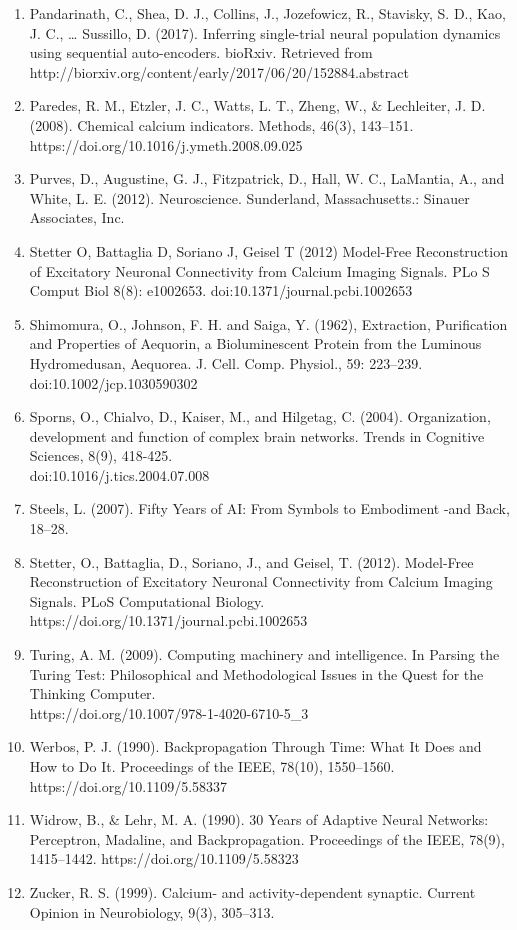 \documentclass{article}
\begin{document}
\begin{enumerate}
\item Pandarinath, C., Shea, D. J., Collins, J., Jozefowicz, R., Stavisky, S. D., Kao, J. C., … Sussillo, D. (2017). Inferring single-trial neural population dynamics using sequential auto-encoders. bioRxiv. Retrieved from http://biorxiv.org/content/early/2017/06/20/152884.abstract
\item Paredes, R. M., Etzler, J. C., Watts, L. T., Zheng, W., & Lechleiter, J. D. (2008). Chemical calcium indicators. Methods, 46(3), 143–151. https://doi.org/10.1016/j.ymeth.2008.09.025
\item Purves, D., Augustine, G. J., Fitzpatrick, D., Hall, W. C., LaMantia, A., and White, L. E. (2012). Neuroscience. Sunderland, Massachusetts.: Sinauer Associates, Inc.
\item Stetter  O,  Battaglia  D,  Soriano  J,  Geisel  T  (2012)  Model-Free  Reconstruction  of  Excitatory  Neuronal  Connectivity  from  Calcium  Imaging  Signals.  PLo S Comput  Biol  8(8):  e1002653.  doi:10.1371/journal.pcbi.1002653
\item Shimomura, O., Johnson, F. H. and Saiga, Y. (1962), Extraction, Purification and Properties of Aequorin, a Bioluminescent Protein from the Luminous Hydromedusan, Aequorea. J. Cell. Comp. Physiol., 59: 223–239. doi:10.1002/jcp.1030590302
\item Sporns, O., Chialvo, D., Kaiser, M., and Hilgetag, C. (2004). Organization, development and function of complex brain networks. Trends in Cognitive Sciences, 8(9), 418-425. \\doi:10.1016/j.tics.2004.07.008
\item Steels, L. (2007). Fifty Years of AI: From Symbols to Embodiment -and Back, 18–28.
\item Stetter, O., Battaglia, D., Soriano, J., and Geisel, T. (2012). Model-Free Reconstruction of Excitatory Neuronal Connectivity from Calcium Imaging Signals. PLoS Computational Biology. https://doi.org/10.1371/journal.pcbi.1002653
\item Turing, A. M. (2009). Computing machinery and intelligence. In Parsing the Turing Test: Philosophical and Methodological Issues in the Quest for the Thinking Computer.\\ https://doi.org/10.1007/978-1-4020-6710-5\_3
\item Werbos, P. J. (1990). Backpropagation Through Time: What It Does and How to Do It. Proceedings of the IEEE, 78(10), 1550–1560. https://doi.org/10.1109/5.58337
\item Widrow, B., & Lehr, M. A. (1990). 30 Years of Adaptive Neural Networks: Perceptron, Madaline, and Backpropagation. Proceedings of the IEEE, 78(9), 1415–1442. https://doi.org/10.1109/5.58323
\item Zucker, R. S. (1999). Calcium- and activity-dependent synaptic. Current Opinion in Neurobiology, 9(3), 305–313.
\end{enumerate}
\end{document}
